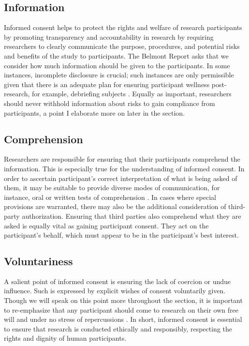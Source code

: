 \documentclass[
  11pt,
]{book}
\begin{document}
\subsection{Information}\label{information}

Informed consent helps to protect the rights and welfare of research participants by promoting transparency and accountability in research by requiring researchers to clearly communicate the purpose, procedures, and potential risks and benefits of the study to participants. The Belmont Report asks that we consider how much information should be given to the participants. In some instances, incomplete disclosure is crucial; such instances are only permissible given that there is an adequate plan for ensuring participant wellness post-research, for example, debriefing subjects \citep[Part C]{national_commission_for_the_protection_of_human_subjects_of_biomedical_and_behavioral_research_belmont_1979}. Equally as important, researchers should never withhold information about risks to gain compliance from participants, a point I elaborate more on later in the section.

\subsection{Comprehension}\label{comprehension}

Researchers are responsible for ensuring that their participants comprehend the information. This is especially true for the understanding of informed consent. In order to ascertain participant's correct interpretation of what is being asked of them, it may be suitable to provide diverse modes of communication, for instance, oral or written tests of comprehension \citep[Part C]{national_commission_for_the_protection_of_human_subjects_of_biomedical_and_behavioral_research_belmont_1979}. In cases where special provisions are warranted, there may also be the additional consideration of third-party authorization. Ensuring that third parties also comprehend what they are asked is equally vital as gaining participant consent. They act on the participant's behalf, which must appear to be in the participant's best interest.

\subsection{Voluntariness}\label{voluntariness}

A salient point of informed consent is ensuring the lack of coercion or undue influence. Such is expressed by explicit wishes of consent voluntarily given. Though we will speak on this point more throughout the section, it is important to re-emphasize that any participant should come to research on their own free will and under no stress of repercussions \citep[Part C]{national_commission_for_the_protection_of_human_subjects_of_biomedical_and_behavioral_research_belmont_1979}. In short, informed consent is essential to ensure that research is conducted ethically and responsibly, respecting the rights and dignity of human participants.
\end{document}
